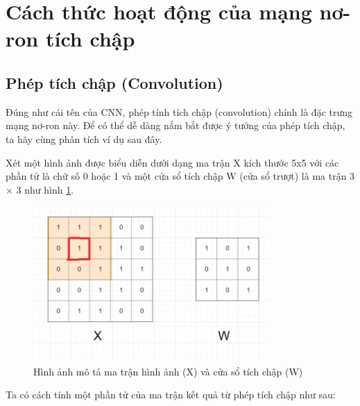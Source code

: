 \documentclass[a4paper]{article}
\begin{document}
\section{Cách thức hoạt động của mạng nơ-ron tích chập}

\subsection{Phép tích chập (Convolution)}

Đúng như cái tên của CNN, phép tính tích chập (convolution) chính là đặc trưng
mạng nơ-ron này. Để có thể dễ dàng nắm bắt được ý tưởng của phép tích chập, ta
hãy cùng phân tích ví dụ sau đây.

Xét một hình ảnh được biểu diễn dưới dạng ma trận X kích thước 5x5 với các phần tử là
chữ số 0 hoặc 1 và một cửa sổ tích chập W (cửa
sổ trượt) là ma trận 3 × 3 như hình \ref{fig:convolution}. 

\begin{figure}[!h]
    \centering
    \includegraphics[width=0.8\textwidth]{image/convolution.png}
    \caption{Hình ảnh mô tả ma trận hình ảnh (X) và cửa sổ tích chập (W)}
    \label{fig:convolution}
\end{figure}

Ta có cách tính một phần tử của ma
trận kết quả từ phép tích chập như sau: 
\end{document}
